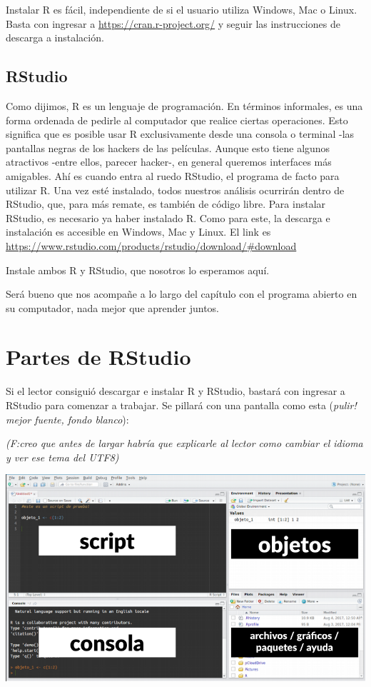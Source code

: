\documentclass[]{book}
\begin{document}
Instalar R es fácil, independiente de si el usuario utiliza Windows, Mac
o Linux. Basta con ingresar a \url{https://cran.r-project.org/} y seguir
las instrucciones de descarga a instalación.

\subsection{RStudio}\label{rstudio}

Como dijimos, R es un lenguaje de programación. En términos informales,
es una forma ordenada de pedirle al computador que realice ciertas
operaciones. Esto significa que es posible usar R exclusivamente desde
una consola o terminal -las pantallas negras de los hackers de las
películas. Aunque esto tiene algunos atractivos -entre ellos, parecer
hacker-, en general queremos interfaces más amigables. Ahí es cuando
entra al ruedo RStudio, el programa de facto para utilizar R. Una vez
esté instalado, todos nuestros análisis ocurrirán dentro de RStudio,
que, para más remate, es también de código libre. Para instalar RStudio,
es necesario ya haber instalado R. Como para este, la descarga e
instalación es accesible en Windows, Mac y Linux. El link es
\url{https://www.rstudio.com/products/rstudio/download/\#download}

Instale ambos R y RStudio, que nosotros lo esperamos aquí.

Será bueno que nos acompañe a lo largo del capítulo con el programa
abierto en su computador, nada mejor que aprender juntos.

\section{Partes de RStudio}\label{partes-de-rstudio}

Si el lector consiguió descargar e instalar R y RStudio, bastará con
ingresar a RStudio para comenzar a trabajar. Se pillará con una pantalla
como esta (\emph{pulir! mejor fuente, fondo blanco}):

\emph{(F:creo que antes de largar habría que explicarle al lector como
cambiar el idioma y ver ese tema del UTF8)}

\begin{center}\includegraphics[width=11.53in]{00-images/rbas-rstudio} \end{center}
\end{document}
